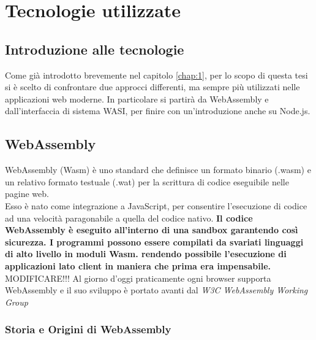 \chapter{Tecnologie utilizzate}
\label{chap:2}

\section{Introduzione alle tecnologie}
\label{sec:IntroduzioneTecnologie}
Come già introdotto brevemente nel capitolo \ref{chap:1}, per lo scopo di questa tesi si è scelto di confrontare due approcci differenti, ma sempre più utilizzati nelle applicazioni web moderne.
In particolare si partirà da WebAssembly e dall'interfaccia di sistema WASI, per finire con un'introduzione anche su Node.js.

\section{WebAssembly}
\label{sec:Wasm}
WebAssembly (Wasm) è uno standard che definisce un formato binario (.wasm) e un relativo formato testuale (.wat) per la scrittura di codice eseguibile nelle pagine web. 
\\Esso è nato come integrazione a JavaScript, per consentire l'esecuzione di codice ad una velocità paragonabile a quella del codice nativo.
\textbf{Il codice WebAssembly è eseguito all'interno di una sandbox garantendo così sicurezza.
I programmi possono essere compilati da svariati linguaggi di alto livello in moduli Wasm. rendendo possibile l'esecuzione di applicazioni lato client in maniera che prima era impensabile.} MODIFICARE!!!
Al giorno d'oggi praticamente ogni browser supporta WebAssembly e il suo sviluppo è portato avanti dal \emph{W3C WebAssembly Working Group}

\subsection{Storia e Origini di WebAssembly}
